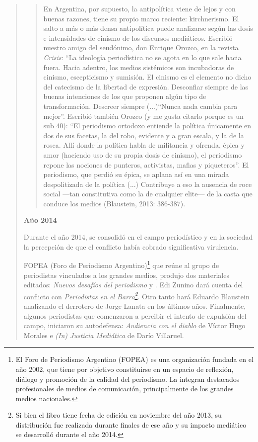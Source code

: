 \begin{quote}
\begin{quote}
	En Argentina, por supuesto, la antipolítica viene de lejos y con buenas razones, tiene su propio marco reciente: kirchnerismo. El salto a más o más densa antipolítica puede analizarse según las dosis e intensidades de cinismo de los discursos mediáticos. Escribió nuestro amigo del seudónimo, don Enrique Orozco, en la revista \emph{Crisis}: ``La ideología periodística no se agota en lo que sale hacia fuera. Hacia adentro, los medios sistémicos son incubadoras de cinismo, escepticismo y sumisión. El cinismo es el elemento no dicho del catecismo de la libertad de expresión. Desconfiar siempre de las buenas intenciones de los que proponen algún tipo de transformación. Descreer siempre (...)``Nunca nada cambia para mejor''. Escribió también Orozco (y me gusta citarlo porque es un sub 40): ``El periodismo ortodoxo entiende la política únicamente en dos de sus facetas, la del robo, evidente y a gran escala, y la de la rosca. Allí donde la política habla de militancia y ofrenda, épica y amor (haciendo uso de su propia dosis de cinismo), el periodismo repone las nociones de punteros, activistas, mafias y piqueteros''. El periodismo, que perdió su épica, se aplana así en una mirada despolitizada de la política (...) Contribuye a eso la ausencia de roce social ---tan constitutiva como la de cualquier elite--- de la casta que conduce los medios (Blaustein, 2013: 386-387).
\end{quote}


\textbf{Año 2014}

Durante el año 2014, se consolidó en el campo periodístico y en la sociedad la percepción de que el conflicto había cobrado significativa virulencia.

FOPEA (Foro de Periodismo Argentino)\footnote{El Foro de Periodismo Argentino (FOPEA) es una organización fundada en el año 2002, que tiene por objetivo constituirse en un espacio de reflexión, diálogo y promoción de la calidad del periodismo. La integran destacados profesionales de medios de comunicación, principalmente de los grandes medios nacionales.} que reúne al grupo de periodistas vinculados a los grandes medios, produjo dos materiales editados: \emph{Nuevos desafíos del periodismo} y . Edi Zunino dará cuenta del conflicto con \emph{Periodistas en el Barro\footnote{Si bien el libro tiene fecha de edición en noviembre del año 2013, su distribución fue realizada durante finales de ese año y su impacto mediático se desarrolló durante el año 2014.}}. Otro tanto hará Eduardo Blaustein analizando el derrotero de Jorge Lanata en los últimos años. Finalmente, algunos periodistas que comenzaron a percibir el intento de expulsión del campo, iniciaron su autodefensa: \emph{Audiencia con el diablo} de Víctor Hugo Morales e \emph{(In) Justicia Mediática} de Darío Villaruel.


\end{quote}

